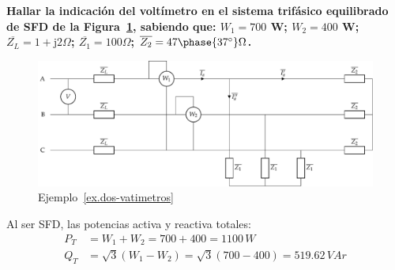 \begin{example}\label{ex.dos-vatimetros}
\textbf{Hallar la indicación del voltímetro en el sistema trifásico equilibrado de SFD de la Figura~\ref{fig.ej_dosvat}, sabiendo que: $W_1=700$ W; $W_2=400$ W; $\overline{Z_L}=1+\mathrm{j}2\Omega$; $\overline{Z_1}=100\Omega$; $\overline{Z_2}=47\phase{37^\circ}\Omega$.}
\begin{figure}[H]
    \centering
    \includegraphics[width=.9\linewidth]{../figs/ej_dosvat.pdf}
    \caption{Ejemplo~\ref{ex.dos-vatimetros}}
    \label{fig.ej_dosvat}
\end{figure}

Al ser SFD, las potencias activa y reactiva totales:
\begin{align*}
    P_T&=W_1+W_2=700+400=1100\,W\\
    Q_T&=\sqrt{3}(W_1-W_2)=\sqrt{3}(700-400)=519.62\,VAr
\end{align*}


\end{example}
